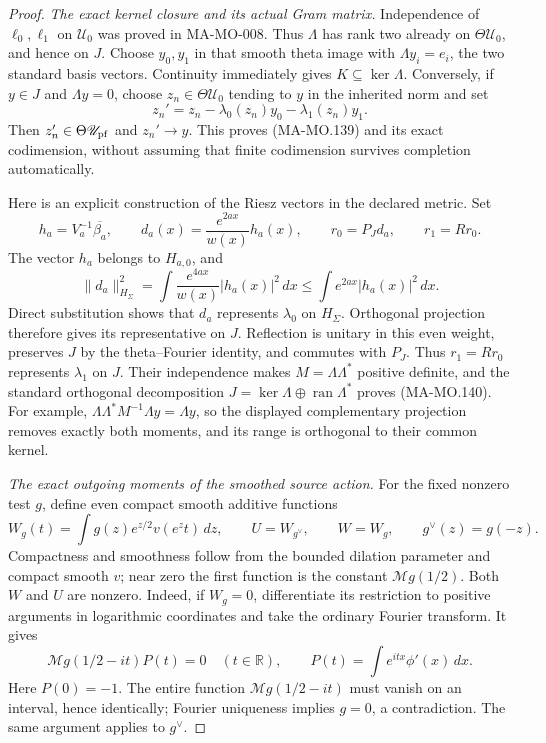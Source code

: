 \begin{proof}
\emph{The exact kernel closure and its actual Gram matrix.}
Independence of \(\ell_0,\ell_1\) on \(\mathscr U_0\)
was proved in MA-MO-008. Thus \(\Lambda\) has rank two
already on \(\Theta\mathscr U_0\), and hence on \(J\).
Choose \(y_0,y_1\) in that smooth theta image with
\(\Lambda y_i=e_i\), the two standard basis vectors.
Continuity immediately gives \(K\subseteq\ker\Lambda\).
Conversely, if \(y\in J\) and \(\Lambda y=0\), choose
\(z_n\in\Theta\mathscr U_0\) tending to \(y\) in the
inherited norm and set
\[
             z_n'=z_n-\lambda_0(z_n)y_0-\lambda_1(z_n)y_1.
 \tag{MA-MO.147}
\]
Then \(z_n'\in\Theta\mathscr U_{\rm pf}\) and
\(z_n'\to y\). This proves (MA-MO.139) and its exact
codimension, without assuming that finite codimension
survives completion automatically.

Here is an explicit construction of the Riesz vectors in
the declared metric. Set
\[
 h_a=V_a^{-1}\overline{\beta_a},\qquad
 d_a(x)=\frac{e^{2ax}}{w(x)}h_a(x),\qquad
 r_0=P_Jd_a,\qquad r_1=Rr_0.
 \tag{MA-MO.148}
\]
The vector \(h_a\) belongs to \(H_{a,0}\), and
\[
 \|d_a\|_{H_\Sigma}^2
  =\int\frac{e^{4ax}}{w(x)}|h_a(x)|^2\,dx
  \le\int e^{2ax}|h_a(x)|^2\,dx.
\]
Direct substitution shows that \(d_a\) represents
\(\lambda_0\) on \(H_\Sigma\). Orthogonal projection
therefore gives its representative on \(J\). Reflection
is unitary in this even weight, preserves \(J\) by the
theta--Fourier identity, and commutes with \(P_J\).
Thus \(r_1=Rr_0\) represents \(\lambda_1\) on \(J\).
Their independence makes \(M=\Lambda\Lambda^*\)
positive definite, and the standard orthogonal decomposition
\(J=\ker\Lambda\oplus\operatorname{ran}\Lambda^*\)
proves (MA-MO.140). For example,
\(\Lambda\Lambda^*M^{-1}\Lambda y=\Lambda y\), so the
displayed complementary projection removes exactly both
moments, and its range is orthogonal to their common kernel.

\emph{The exact outgoing moments of the smoothed source action.}
For the fixed nonzero test \(g\), define even compact
smooth additive functions
\[
 W_g(t)=\int g(z)e^{z/2}v(e^zt)\,dz,
             \qquad U=W_{g^\vee},\qquad W=W_g,
             \qquad g^\vee(z)=g(-z).
 \tag{MA-MO.149}
\]
Compactness and smoothness follow from the bounded dilation
parameter and compact smooth \(v\); near zero the first
function is the constant \(\mathcal Mg(1/2)\).
Both \(W\) and \(U\) are nonzero. Indeed, if \(W_g=0\),
differentiate its restriction to positive arguments in
logarithmic coordinates and take the ordinary Fourier
transform. It gives
\[
      \mathcal Mg(1/2-it)P(t)=0\quad(t\in\mathbb R),
                  \qquad P(t)=\int e^{itx}\phi'(x)\,dx.
 \tag{MA-MO.150}
\]
Here \(P(0)=-1\). The entire function
\(\mathcal Mg(1/2-it)\) must vanish on an interval, hence
identically; Fourier uniqueness implies \(g=0\), a
contradiction. The same argument applies to \(g^\vee\).


\end{proof}

